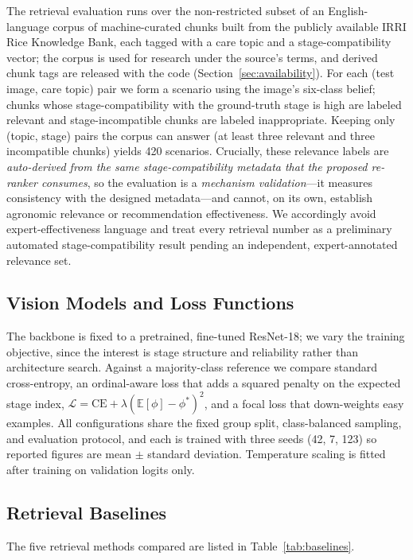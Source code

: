\documentclass[conference]{IEEEtran}
\begin{document}
The retrieval evaluation runs over the non-restricted subset of an English-language corpus of machine-curated chunks built from the publicly available IRRI Rice Knowledge Bank, each tagged with a care topic and a stage-compatibility vector; the corpus is used for research under the source's terms, and derived chunk tags are released with the code (Section~\ref{sec:availability}). For each (test image, care topic) pair we form a scenario using the image's six-class belief; chunks whose stage-compatibility with the ground-truth stage is high are labeled relevant and stage-incompatible chunks are labeled inappropriate. Keeping only (topic, stage) pairs the corpus can answer (at least three relevant and three incompatible chunks) yields 420 scenarios. Crucially, these relevance labels are \emph{auto-derived from the same stage-compatibility metadata that the proposed re-ranker consumes}, so the evaluation is a \emph{mechanism validation}---it measures consistency with the designed metadata---and cannot, on its own, establish agronomic relevance or recommendation effectiveness. We accordingly avoid expert-effectiveness language and treat every retrieval number as a preliminary automated stage-compatibility result pending an independent, expert-annotated relevance set.

\subsection{Vision Models and Loss Functions}

The backbone is fixed to a pretrained, fine-tuned ResNet-18; we vary the training objective, since the interest is stage structure and reliability rather than architecture search. Against a majority-class reference we compare standard cross-entropy, an ordinal-aware loss that adds a squared penalty on the expected stage index, $\mathcal{L}=\mathrm{CE}+\lambda(\mathbb{E}[\phi]-\phi^*)^2$, and a focal loss that down-weights easy examples. All configurations share the fixed group split, class-balanced sampling, and evaluation protocol, and each is trained with three seeds (42, 7, 123) so reported figures are mean $\pm$ standard deviation. Temperature scaling is fitted after training on validation logits only.

\subsection{Retrieval Baselines}

The five retrieval methods compared are listed in Table~\ref{tab:baselines}.
\end{document}

